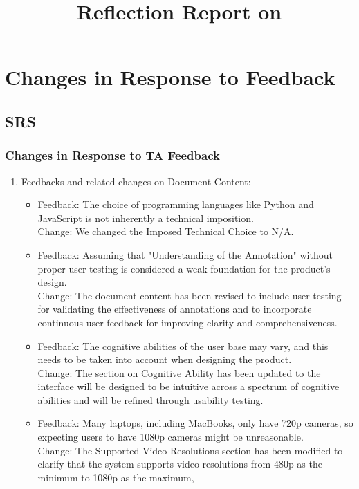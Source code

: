 \documentclass{article}
\title{Reflection Report on \progname}
\author{\authname}
\date{}
\begin{document}
\maketitle

\section{Changes in Response to Feedback}

\subsection{SRS}
\subsubsection{Changes in Response to TA Feedback}
\begin{enumerate}
    \item Feedbacks and related changes on Document Content:
    \begin{itemize}
        \item Feedback: The choice of programming languages like Python and JavaScript is not inherently a technical imposition. \\
                Change: We changed the Imposed Technical Choice to N/A.
        \item Feedback: Assuming that "Understanding of the Annotation" without proper user testing is considered a weak foundation for the product's design. \\
                Change: The document content has been revised to include user testing for validating the effectiveness of annotations and to incorporate continuous user feedback for improving clarity and comprehensiveness.
        \item Feedback: The cognitive abilities of the user base may vary, and this needs to be taken into account when designing the product. \\
                Change: The section on Cognitive Ability has been updated to the interface will be designed to be intuitive across a spectrum of cognitive abilities and will be refined through usability testing.
        \item Feedback: Many laptops, including MacBooks, only have 720p cameras, so expecting users to have 1080p cameras might be unreasonable. \\
                Change: The Supported Video Resolutions section has been modified to clarify that the system supports video resolutions from 480p as the minimum to 1080p as the maximum, 

\end{itemize}
\end{enumerate}
\end{document}
